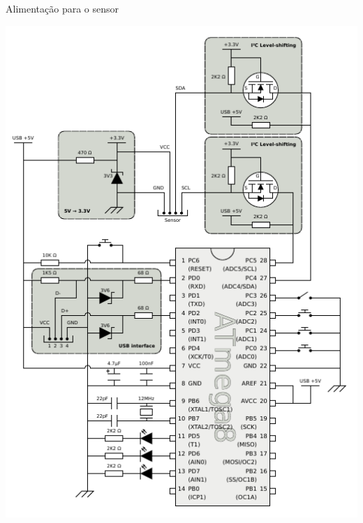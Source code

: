 \documentclass{beamer}
\begin{document}
\begin{frame}{Alimentação para o sensor}
	\begin{center}
		\includegraphics[keepaspectratio, width=1.0\textwidth, height=0.8\textheight, clip, viewport=0.00in 2.75in 1.80in 3.75in]{../monografia/img/AVR-magnetometer-usb-mouse.pdf}
	\end{center}
\end{frame}
\end{document}
